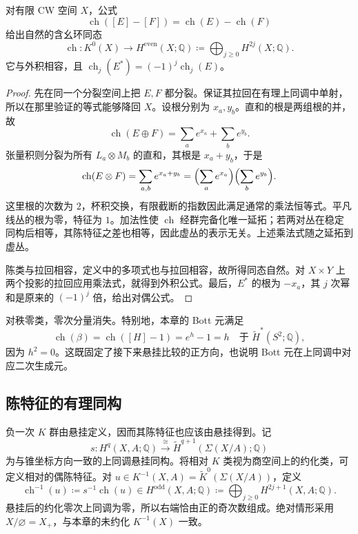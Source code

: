 \begin{proposition}\label{g2:prop:chern-character-ring}
	对有限 CW 空间 \(X\)，公式
	\[
		\operatorname{ch}([E]-[F])=\operatorname{ch}(E)-\operatorname{ch}(F)
	\]
	给出自然的含幺环同态
	\[
		\operatorname{ch}:K^0(X)\longrightarrow H^{\mathrm{even}}(X;\mathbb Q)
		\coloneqq\bigoplus_{j\ge0}H^{2j}(X;\mathbb Q).
	\]
	它与外积相容，且 \(\operatorname{ch}_j(E^*)=(-1)^j\operatorname{ch}_j(E)\)。
\end{proposition}
\begin{proof}
	先在同一个分裂空间上把 \(E,F\) 都分裂。保证其拉回在有理上同调中单射，所以在那里验证的等式能够降回 \(X\)。设根分别为 \(x_a,y_b\)。直和的根是两组根的并，故
	\[
		\operatorname{ch}(E\oplus F)=\sum_a e^{x_a}+\sum_b e^{y_b}.
	\]
	张量积则分裂为所有 \(L_a\otimes M_b\) 的直和，其根是 \(x_a+y_b\)，于是
	\[
		\operatorname{ch}(E\otimes F)
		=\sum_{a,b}e^{x_a+y_b}
		=\Bigl(\sum_a e^{x_a}\Bigr)\Bigl(\sum_b e^{y_b}\Bigr).
	\]
	这里根的次数为 \(2\)，杯积交换，有限截断的指数因此满足通常的乘法恒等式。平凡线丛的根为零，特征为 \(1\)。加法性使 \(\operatorname{ch}\) 经群完备化唯一延拓；若两对丛在稳定同构后相等，其陈特征之差也相等，因此虚丛的表示无关。上述乘法式随之延拓到虚丛。

	陈类与拉回相容，定义中的多项式也与拉回相容，故所得同态自然。对 \(X\times Y\) 上两个投影的拉回应用乘法式，就得到外积公式。最后，\(E^*\) 的根为 \(-x_a\)，其 \(j\) 次幂和是原来的 \((-1)^j\) 倍，给出对偶公式。
\end{proof}

对秩零类，零次分量消失。特别地，本章的 Bott 元满足
\begin{equation}\label{g2:eq:chern-bott-positive}
	\operatorname{ch}(\beta)=\operatorname{ch}([H]-1)=e^h-1=h
	\quad\text{于 }\widetilde H^*(S^2;\mathbb Q),
\end{equation}
因为 \(h^2=0\)。这既固定了接下来悬挂比较的正方向，也说明 Bott 元在上同调中对应二次生成元。

\subsection{陈特征的有理同构}
\label{g2:subsec:2404:02}
负一次 \(K\) 群由悬挂定义，因而其陈特征也应该由悬挂得到。记
\[
	s:H^q(X,A;\mathbb Q)\xrightarrow{\cong}
	\widetilde H^{q+1}(\Sigma(X/A);\mathbb Q)
\]
为与锥坐标方向一致的上同调悬挂同构。将相对 \(K\) 类视为商空间上的约化类，可定义相对的偶陈特征。对 \(u\in K^{-1}(X,A)=\widetilde K^0(\Sigma(X/A))\)，定义
\[
	\operatorname{ch}^{-1}(u)\coloneqq s^{-1}\operatorname{ch}(u)
	\in H^{\mathrm{odd}}(X,A;\mathbb Q)
	\coloneqq\bigoplus_{j\ge0}H^{2j+1}(X,A;\mathbb Q).
\]
悬挂后的约化零次上同调为零，所以右端恰由正的奇次数组成。绝对情形采用 \(X/\varnothing=X_+\)，与本章的未约化 \(K^{-1}(X)\) 一致。

